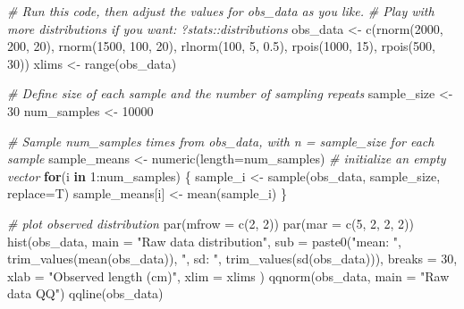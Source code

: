 \documentclass[
  11pt,
  a4paper,
]{book}
\newenvironment{Shaded}{\begin{snugshade}}{\end{snugshade}}
\newcommand{\AttributeTok}[1]{\textcolor[rgb]{0.77,0.63,0.00}{#1}}
\newcommand{\CommentTok}[1]{\textcolor[rgb]{0.56,0.35,0.01}{\textit{#1}}}
\newcommand{\ControlFlowTok}[1]{\textcolor[rgb]{0.13,0.29,0.53}{\textbf{#1}}}
\newcommand{\DecValTok}[1]{\textcolor[rgb]{0.00,0.00,0.81}{#1}}
\newcommand{\FloatTok}[1]{\textcolor[rgb]{0.00,0.00,0.81}{#1}}
\newcommand{\FunctionTok}[1]{\textcolor[rgb]{0.00,0.00,0.00}{#1}}
\newcommand{\NormalTok}[1]{#1}
\newcommand{\OtherTok}[1]{\textcolor[rgb]{0.56,0.35,0.01}{#1}}
\newcommand{\SpecialCharTok}[1]{\textcolor[rgb]{0.00,0.00,0.00}{#1}}
\newcommand{\StringTok}[1]{\textcolor[rgb]{0.31,0.60,0.02}{#1}}
\begin{document}
\begin{Shaded}
\begin{Highlighting}[]
\CommentTok{\# Run this code, then adjust the values for obs\_data as you like.}
\CommentTok{\# Play with more distributions if you want: ?stats::distributions}
\NormalTok{obs\_data }\OtherTok{\textless{}{-}} \FunctionTok{c}\NormalTok{(}\FunctionTok{rnorm}\NormalTok{(}\DecValTok{2000}\NormalTok{, }\DecValTok{200}\NormalTok{, }\DecValTok{20}\NormalTok{), }
              \FunctionTok{rnorm}\NormalTok{(}\DecValTok{1500}\NormalTok{, }\DecValTok{100}\NormalTok{, }\DecValTok{20}\NormalTok{), }
              \FunctionTok{rlnorm}\NormalTok{(}\DecValTok{100}\NormalTok{, }\DecValTok{5}\NormalTok{, }\FloatTok{0.5}\NormalTok{),}
              \FunctionTok{rpois}\NormalTok{(}\DecValTok{1000}\NormalTok{, }\DecValTok{15}\NormalTok{), }
              \FunctionTok{rpois}\NormalTok{(}\DecValTok{500}\NormalTok{, }\DecValTok{30}\NormalTok{))}
\NormalTok{xlims }\OtherTok{\textless{}{-}} \FunctionTok{range}\NormalTok{(obs\_data)}

\CommentTok{\# Define size of each sample and the number of sampling repeats}
\NormalTok{sample\_size }\OtherTok{\textless{}{-}} \DecValTok{30}
\NormalTok{num\_samples }\OtherTok{\textless{}{-}} \DecValTok{10000}

\CommentTok{\# Sample num\_samples times from obs\_data, with n = sample\_size for each sample}
\NormalTok{sample\_means }\OtherTok{\textless{}{-}} \FunctionTok{numeric}\NormalTok{(}\AttributeTok{length=}\NormalTok{num\_samples) }\CommentTok{\# initialize an empty vector}
\ControlFlowTok{for}\NormalTok{(i }\ControlFlowTok{in} \DecValTok{1}\SpecialCharTok{:}\NormalTok{num\_samples) \{}
\NormalTok{  sample\_i }\OtherTok{\textless{}{-}} \FunctionTok{sample}\NormalTok{(obs\_data, sample\_size, }\AttributeTok{replace=}\NormalTok{T)}
\NormalTok{  sample\_means[i] }\OtherTok{\textless{}{-}} \FunctionTok{mean}\NormalTok{(sample\_i)}
\NormalTok{\}}

\CommentTok{\# plot observed distribution}
\FunctionTok{par}\NormalTok{(}\AttributeTok{mfrow =} \FunctionTok{c}\NormalTok{(}\DecValTok{2}\NormalTok{, }\DecValTok{2}\NormalTok{))}
\FunctionTok{par}\NormalTok{(}\AttributeTok{mar =} \FunctionTok{c}\NormalTok{(}\DecValTok{5}\NormalTok{, }\DecValTok{2}\NormalTok{, }\DecValTok{2}\NormalTok{, }\DecValTok{2}\NormalTok{)) }
\FunctionTok{hist}\NormalTok{(obs\_data,}
     \AttributeTok{main =} \StringTok{"Raw data distribution"}\NormalTok{,}
     \AttributeTok{sub =} \FunctionTok{paste0}\NormalTok{(}\StringTok{"mean: "}\NormalTok{, }\FunctionTok{trim\_values}\NormalTok{(}\FunctionTok{mean}\NormalTok{(obs\_data)), }
                  \StringTok{", sd: "}\NormalTok{, }\FunctionTok{trim\_values}\NormalTok{(}\FunctionTok{sd}\NormalTok{(obs\_data))),}
     \AttributeTok{breaks =} \DecValTok{30}\NormalTok{, }\AttributeTok{xlab =} \StringTok{"Observed length (cm)"}\NormalTok{, }\AttributeTok{xlim =}\NormalTok{ xlims}
\NormalTok{) }
\FunctionTok{qqnorm}\NormalTok{(obs\_data, }\AttributeTok{main =} \StringTok{"Raw data QQ"}\NormalTok{)}
\FunctionTok{qqline}\NormalTok{(obs\_data)}


\end{Highlighting}
\end{Shaded}
\end{document}
